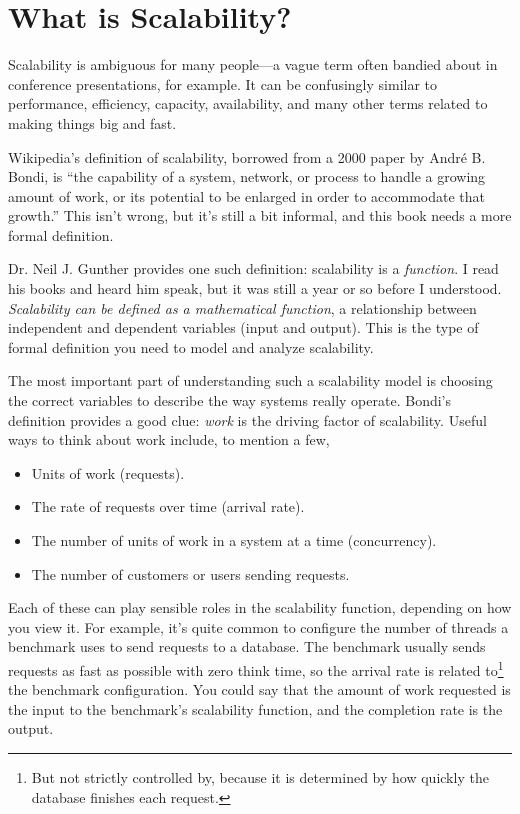 \documentclass{vivid_layout}
\begin{document}
\newpage

\section{What is Scalability?}

Scalability is ambiguous for many people---a vague term often bandied about in
conference presentations, for example. It can be confusingly similar to
performance, efficiency, capacity, availability, and many other terms related to
making things big and fast.

Wikipedia's definition of scalability, borrowed from a 2000 paper by Andr\'e B.
Bondi, is ``the capability of a system, network, or process to handle a growing
amount of work, or its potential to be enlarged in order to accommodate that
growth.'' This isn't wrong, but it's still a bit informal, and this book needs a
more formal definition.

Dr. Neil J. Gunther provides one such definition: scalability is a {\itshape
function}. I read his books and heard him speak, but it was still a year or so
before I understood. {\itshape Scalability can be defined as a mathematical
function}, a relationship between independent and dependent variables (input and
output). This is the type of formal definition you need to model and analyze
scalability.

The most important part of understanding such a scalability model is choosing
the correct variables to describe the way systems really operate.  Bondi's
definition provides a good clue: {\itshape work} is the driving factor of
scalability. Useful ways to think about work include, to mention a few,

\begin{itemize}
\item Units of work (requests).
\item The rate of requests over time (arrival rate).
\item The number of units of work in a system at a time (concurrency).
\item The number of customers or users sending requests.
\end{itemize}

Each of these can play sensible roles in the scalability function, depending on
how you view it. For example, it's quite common to configure the number of
threads a benchmark uses to send requests to a database. The benchmark usually
sends requests as fast as possible with zero think time, so the arrival rate is
related to\footnote{But not strictly controlled by, because it is determined by
how quickly the database finishes each request.} the benchmark configuration.
You could say that the amount of work requested is the input to the benchmark's
scalability function, and the completion rate is the output.
\end{document}
